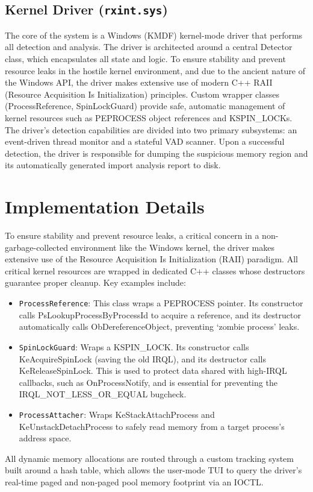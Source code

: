\documentclass[journal]{IEEEtran}
\begin{document}
\subsection{Kernel Driver (\texttt{rxint.sys})}
The core of the system is a Windows (KMDF) kernel-mode driver that performs all detection and analysis. The driver is architected around a central Detector class, which encapsulates all state and logic. To ensure stability and prevent resource leaks in the hostile kernel environment, and due to the ancient nature of the Windows API, the driver makes extensive use of modern C++ RAII (Resource Acquisition Is Initialization) principles. Custom wrapper classes (ProcessReference, SpinLockGuard) provide safe, automatic management of kernel resources such as PEPROCESS object references and KSPIN\_LOCKs. The driver's detection capabilities are divided into two primary subsystems: an event-driven thread monitor and a stateful VAD scanner. Upon a successful detection, the driver is responsible for dumping the suspicious memory region and its automatically generated import analysis report to disk.

\section{Implementation Details}\label{sec:implementation}
To ensure stability and prevent resource leaks, a critical concern in a non-garbage-collected environment like the Windows kernel, the driver makes extensive use of the Resource Acquisition Is Initialization (RAII) paradigm. All critical kernel resources are wrapped in dedicated C++ classes whose destructors guarantee proper cleanup. Key examples include:
\begin{itemize}
\item \texttt{ProcessReference}: This class wraps a PEPROCESS pointer. Its constructor calls PsLookupProcessByProcessId to acquire a reference, and its destructor automatically calls ObDereferenceObject, preventing `zombie process' leaks.
\item \texttt{SpinLockGuard}: Wraps a KSPIN\_LOCK. Its constructor calls KeAcquireSpinLock (saving the old IRQL), and its destructor calls KeReleaseSpinLock. This is used to protect data shared with high-IRQL callbacks, such as OnProcessNotify, and is essential for preventing the IRQL\_NOT\_LESS\_OR\_EQUAL bugcheck.
\item \texttt{ProcessAttacher}: Wraps KeStackAttachProcess and KeUnstackDetachProcess to safely read memory from a target process's address space.
\end{itemize}
All dynamic memory allocations are routed through a custom tracking system built around a hash table, which allows the user-mode TUI to query the driver's real-time paged and non-paged pool memory footprint via an IOCTL.
\end{document}
